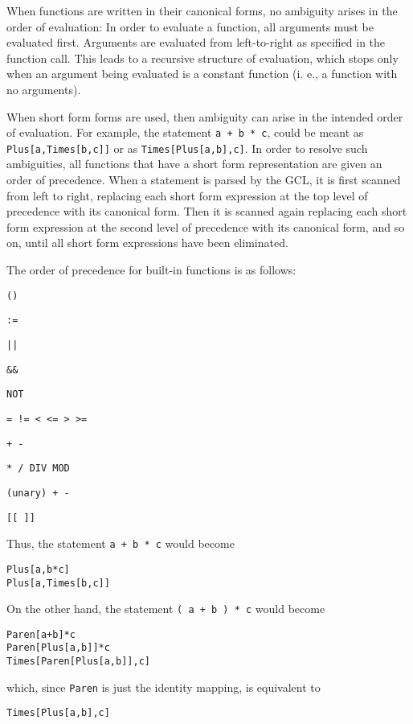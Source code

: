 When functions are written in their canonical forms, no ambiguity
arises in the order of evaluation: In order to evaluate a function,
all arguments must be evaluated first.  Arguments are evaluated from
left-to-right as specified in the function call.
This leads to a recursive structure of evaluation,
which stops only when an argument being evaluated is a constant
function (i. e., a function with no arguments).

When short form forms are used, then ambiguity can arise in the
intended order of evaluation.  For example, the statement \verb&a + b * c&,
could be meant as \verb+Plus[a,Times[b,c]]+ or as
\verb+Times[Plus[a,b],c]+.  In order to resolve such ambiguities, all
functions that have a short form representation are given an order of
precedence.  When a statement is parsed by the GCL, it is first
scanned from left to right, replacing each short form expression at the
top level of precedence with its canonical form.  Then it is scanned
again replacing each short form expression at the second level of
precedence with its canonical form, and so on, until all short form
expressions have been eliminated.  

The order of precedence for built-in functions is as follows:
\bd
\item
\verb+()+
\item
\verb+:=+
\item
\verb+||+
\item
\verb+&&+
\item
\verb+NOT+
\item
\verb+= != < <= > >=+
\item
\verb&+ -&
\item
\verb+* / DIV MOD+
\item
\verb&(unary) + -&
\item
\verb+[[ ]]+
\ed

Thus, the statement \verb&a + b * c& would become 
\begin{verbatim}
Plus[a,b*c]
Plus[a,Times[b,c]]
\end{verbatim}

\noindent
On the other hand, the statement \verb&( a + b ) * c& would become 
\begin{verbatim}
Paren[a+b]*c
Paren[Plus[a,b]]*c
Times[Paren[Plus[a,b]],c]
\end{verbatim}

\noindent
which, since \verb+Paren+ is just the identity mapping, is equivalent to
\begin{verbatim}
Times[Plus[a,b],c]
\end{verbatim}

